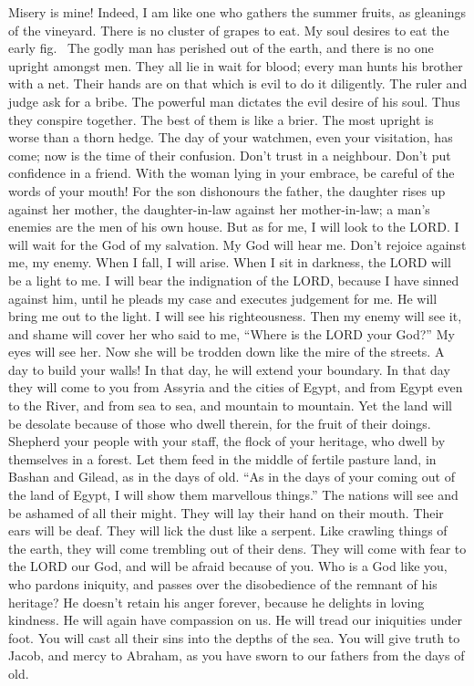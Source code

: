  Misery is mine! Indeed, I am like one who gathers the
summer fruits, as gleanings of the vineyard. There is no cluster of
grapes to eat. My soul desires to eat the early fig.~ The
godly man has perished out of the earth, and there is no one upright
amongst men. They all lie in wait for blood; every man hunts his brother
with a net.  Their hands are on that which is evil to do it
diligently. The ruler and judge ask for a bribe. The powerful man
dictates the evil desire of his soul. Thus they conspire together.
 The best of them is like a brier. The most upright is worse
than a thorn hedge. The day of your watchmen, even your visitation, has
come; now is the time of their confusion.  Don't trust in a
neighbour. Don't put confidence in a friend. With the woman lying in
your embrace, be careful of the words of your mouth!  For
the son dishonours the father, the daughter rises up against her mother,
the daughter-in-law against her mother-in-law; a man's enemies are the
men of his own house.  But as for me, I will look to the
LORD. I will wait for the God of my salvation. My God will hear me.
 Don't rejoice against me, my enemy. When I fall, I will
arise. When I sit in darkness, the LORD will be a light to me.
 I will bear the indignation of the LORD, because I have
sinned against him, until he pleads my case and executes judgement for
me. He will bring me out to the light. I will see his righteousness.
 Then my enemy will see it, and shame will cover her who
said to me, ``Where is the LORD your God?'' My eyes will see her. Now
she will be trodden down like the mire of the streets.  A
day to build your walls! In that day, he will extend your boundary.
 In that day they will come to you from Assyria and the
cities of Egypt, and from Egypt even to the River, and from sea to sea,
and mountain to mountain.  Yet the land will be desolate
because of those who dwell therein, for the fruit of their doings.
 Shepherd your people with your staff, the flock of your
heritage, who dwell by themselves in a forest. Let them feed in the
middle of fertile pasture land, in Bashan and Gilead, as in the days of
old.  ``As in the days of your coming out of the land of
Egypt, I will show them marvellous things.''  The nations
will see and be ashamed of all their might. They will lay their hand on
their mouth. Their ears will be deaf.  They will lick the
dust like a serpent. Like crawling things of the earth, they will come
trembling out of their dens. They will come with fear to the LORD our
God, and will be afraid because of you.  Who is a God like
you, who pardons iniquity, and passes over the disobedience of the
remnant of his heritage? He doesn't retain his anger forever, because he
delights in loving kindness.  He will again have compassion
on us. He will tread our iniquities under foot. You will cast all their
sins into the depths of the sea.  You will give truth to
Jacob, and mercy to Abraham, as you have sworn to our fathers from the
days of old.

